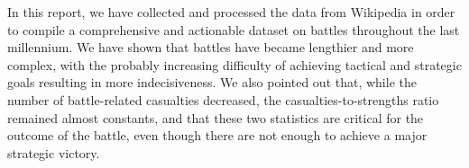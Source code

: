 In this report, we have collected and processed the data from Wikipedia in order to compile a comprehensive and actionable dataset on battles throughout the last millennium. We have shown that battles have became lengthier and more complex, with the probably increasing difficulty of achieving tactical and strategic goals resulting in more indecisiveness. We also pointed out that, while the number of battle-related casualties decreased, the casualties-to-strengths ratio remained almost constants, and that these two statistics are critical for the outcome of the battle, even though there are not enough to achieve a major strategic victory.